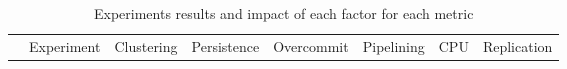 \documentclass[runningheads]{llncs}
\begin{document}
\begin{table}
\caption{Experiments results and impact of each factor for each metric}
\centering
\begin{tabular}{|l|c|c|c|c|c|c|c|} 
\hline
\multicolumn{1}{|c|}{}                                                                         & Experiment                                                         & Clustering                                                                     & Persistence                                                                    & Overcommit                                                                     & Pipelining                                                                        & CPU                                                                               & Replication                                                                        \\ 
\cline{2-8}

\end{tabular}
\end{table}
\end{document}
